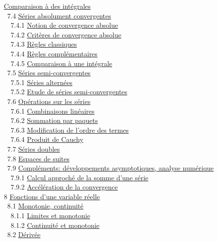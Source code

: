 \documentclass[]{article}
\begin{document}
\href{coursse37.html\#x47-2160007.3.4}{Comparaison à des intégrales} \\
~7.4 \href{coursse38.html\#x48-2170007.4}{Séries absolument
convergentes} \\ ~~7.4.1 \href{coursse38.html\#x48-2180007.4.1}{Notion
de convergence absolue} \\ ~~7.4.2
\href{coursse38.html\#x48-2190007.4.2}{Critères de convergence absolue}
\\ ~~7.4.3 \href{coursse38.html\#x48-2200007.4.3}{Règles classiques} \\
~~7.4.4 \href{coursse38.html\#x48-2210007.4.4}{Règles complémentaires}
\\ ~~7.4.5 \href{coursse38.html\#x48-2220007.4.5}{Comparaison à une
intégrale} \\ ~7.5 \href{coursse39.html\#x49-2230007.5}{Séries
semi-convergentes} \\ ~~7.5.1
\href{coursse39.html\#x49-2240007.5.1}{Séries alternées} \\ ~~7.5.2
\href{coursse39.html\#x49-2250007.5.2}{Etude de séries
semi-convergentes} \\ ~7.6
\href{coursse40.html\#x50-2260007.6}{Opérations sur les séries} \\
~~7.6.1 \href{coursse40.html\#x50-2270007.6.1}{Combinaisons linéaires}
\\ ~~7.6.2 \href{coursse40.html\#x50-2280007.6.2}{Sommation par paquets}
\\ ~~7.6.3 \href{coursse40.html\#x50-2290007.6.3}{Modification de
l'ordre des termes} \\ ~~7.6.4
\href{coursse40.html\#x50-2300007.6.4}{Produit de Cauchy} \\ ~7.7
\href{coursse41.html\#x51-2310007.7}{Séries doubles} \\ ~7.8
\href{coursse42.html\#x52-2320007.8}{Espaces de suites} \\ ~7.9
\href{coursse43.html\#x53-2330007.9}{Compléments: développements
asymptotiques, analyse numérique} \\ ~~7.9.1
\href{coursse43.html\#x53-2340007.9.1}{Calcul approché de la somme d'une
série} \\ ~~7.9.2 \href{coursse43.html\#x53-2350007.9.2}{Accélération de
la convergence} \\ 8 \href{coursch9.html\#x54-2360008}{Fonctions d'une
variable réelle} \\ ~8.1 \href{coursse44.html\#x55-2370008.1}{Monotonie,
continuité} \\ ~~8.1.1 \href{coursse44.html\#x55-2380008.1.1}{Limites et
monotonie} \\ ~~8.1.2 \href{coursse44.html\#x55-2390008.1.2}{Continuité
et monotonie} \\ ~8.2 \href{coursse45.html\#x56-2400008.2}{Dérivée} \\
\end{document}
